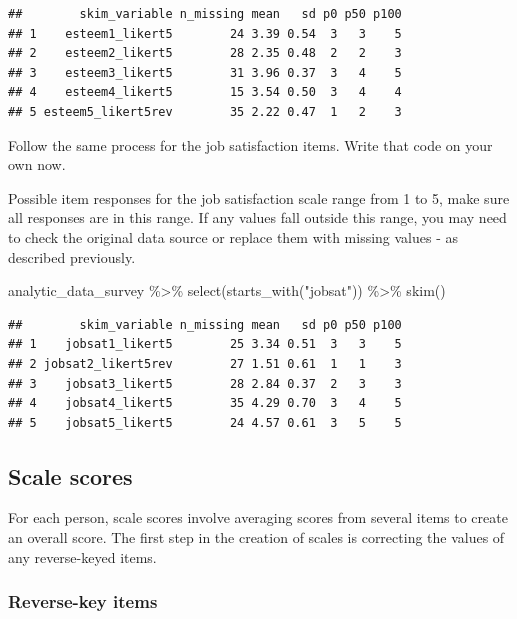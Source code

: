 \documentclass[
]{krantz}
\makeatletter
\newenvironment{Shaded}{\begin{snugshade}}{\end{snugshade}}
\newcommand{\FunctionTok}[1]{\textcolor[rgb]{0,0,0}{#1}}
\newcommand{\NormalTok}[1]{#1}
\newcommand{\SpecialCharTok}[1]{\textcolor[rgb]{0,0,0}{#1}}
\newcommand{\StringTok}[1]{\textcolor[rgb]{0.5,0.5,0.5}{#1}}
\newenvironment{kframe}{%
\medskip{}
\setlength{\fboxsep}{.8em}
 \def\at@end@of@kframe{}%
 \ifinner\ifhmode%
  \def\at@end@of@kframe{\end{minipage}}%
  \begin{minipage}{\columnwidth}%
 \fi\fi%
 \def\FrameCommand##1{\hskip\@totalleftmargin \hskip-\fboxsep
 \colorbox{shadecolor}{##1}\hskip-\fboxsep
     \hskip-\linewidth \hskip-\@totalleftmargin \hskip\columnwidth}%
 \MakeFramed {\advance\hsize-\width
   \@totalleftmargin\z@ \linewidth\hsize
   \@setminipage}}%
 {\par\unskip\endMakeFramed%
 \at@end@of@kframe}
\renewenvironment{Shaded}{\begin{kframe}}{\end{kframe}}
\makeatother
\begin{document}
\begin{verbatim}
##        skim_variable n_missing mean   sd p0 p50 p100
## 1    esteem1_likert5        24 3.39 0.54  3   3    5
## 2    esteem2_likert5        28 2.35 0.48  2   2    3
## 3    esteem3_likert5        31 3.96 0.37  3   4    5
## 4    esteem4_likert5        15 3.54 0.50  3   4    4
## 5 esteem5_likert5rev        35 2.22 0.47  1   2    3
\end{verbatim}

Follow the same process for the job satisfaction items. Write that code on your own now.

Possible item responses for the job satisfaction scale range from 1 to 5, make sure all responses are in this range. If any values fall outside this range, you may need to check the original data source or replace them with missing values - as described previously.

\begin{Shaded}
\begin{Highlighting}[]
\NormalTok{analytic\_data\_survey }\SpecialCharTok{\%\textgreater{}\%}
  \FunctionTok{select}\NormalTok{(}\FunctionTok{starts\_with}\NormalTok{(}\StringTok{"jobsat"}\NormalTok{)) }\SpecialCharTok{\%\textgreater{}\%}
  \FunctionTok{skim}\NormalTok{()}
\end{Highlighting}
\end{Shaded}

\begin{verbatim}
##        skim_variable n_missing mean   sd p0 p50 p100
## 1    jobsat1_likert5        25 3.34 0.51  3   3    5
## 2 jobsat2_likert5rev        27 1.51 0.61  1   1    3
## 3    jobsat3_likert5        28 2.84 0.37  2   3    3
## 4    jobsat4_likert5        35 4.29 0.70  3   4    5
## 5    jobsat5_likert5        24 4.57 0.61  3   5    5
\end{verbatim}

\hypertarget{scale-scores-2}{%
\subsection{Scale scores}\label{scale-scores-2}}

For each person, scale scores involve averaging scores from several items to create an overall score. The first step in the creation of scales is correcting the values of any reverse-keyed items.

\hypertarget{reverse-key-items-2}{%
\subsubsection{Reverse-key items}\label{reverse-key-items-2}}
\end{document}
